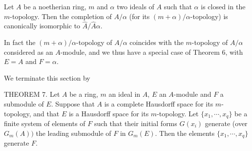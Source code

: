 Let $A$ be a noetherian ring, $m$ and $\alpha$ two ideals of $A$ such that $\alpha$ is closed in the $m$-topology. Then the completion of $A/\alpha$ (for its $(m+\alpha)/\alpha$-topology) is canonically isomorphic to $\hat{A}/\hat{A}\alpha$.

In fact the $(m+\alpha)/\alpha$-topology of $A/\alpha$ coincides with the $m$-topology of $A/\alpha$ considered as an $A$-module, and we thus have a special case of Theorem 6, with $E=A$ and $F=\alpha$.

We terminate this section by

THEOREM 7. Let $A$ be a ring, $m$ an ideal in $A$, $E$ an $A$-module and $F$ a submodule of $E$. Suppose that $A$ is a complete Hausdorff space for its $m$-topology, and that $E$ is a Hausdorff space for its $m$-topology. Let $\{x_1, \cdots, x_q\}$ be a finite system of elements of $F$ such that their initial forms $G(x_i)$ generate (over $G_m(A))$ the leading submodule of $F$ in $G_m(E)$. Then the elements $\{x_1, \cdots, x_q\}$ generate $F$.